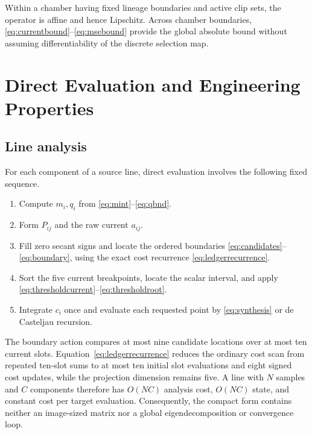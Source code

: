 \documentclass[journal]{IEEEtran}
\begin{document}
Within a chamber having fixed lineage boundaries and active clip sets, the
operator is affine and hence Lipschitz. Across chamber boundaries,
\eqref{eq:currentbound}--\eqref{eq:msebound} provide the global absolute
bound without assuming differentiability of the discrete selection map.



\section{Direct Evaluation and Engineering Properties}

\subsection{Line analysis}

For each component of a source line, direct evaluation involves the following
fixed sequence.

\begin{enumerate}
\item Compute \(m_i,q_i\) from \eqref{eq:mint}--\eqref{eq:qbnd}.
\item Form \(P_{ij}\) and the raw current \(a_{ij}\).
\item Fill zero secant signs and locate the ordered boundaries
      \eqref{eq:candidates}--\eqref{eq:boundary}, using the exact cost
      recurrence \eqref{eq:ledgerrecurrence}.
\item Sort the five current breakpoints, locate the scalar interval, and
      apply \eqref{eq:thresholdcurrent}--\eqref{eq:thresholdroot}.
\item Integrate \(c_i\) once and evaluate each requested point by
      \eqref{eq:synthesis} or de Casteljau recursion.
\end{enumerate}

The boundary action compares at most nine candidate locations over at most
ten current slots. Equation~\eqref{eq:ledgerrecurrence} reduces the ordinary
cost scan from repeated ten-slot sums to at most ten initial slot evaluations
and eight signed cost updates, while the projection dimension remains five. A line with
\(N\) samples and \(C\) components therefore has \(O(NC)\) analysis cost,
\(O(NC)\) state, and constant cost per target evaluation. Consequently, the
compact form contains neither an image-sized matrix nor a global
eigendecomposition or convergence loop.
\end{document}
